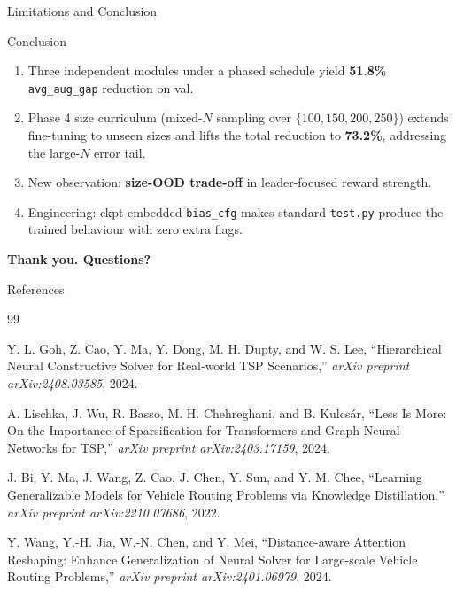 \documentclass[aspectratio=169,11pt]{beamer}
\newcommand{\tightitems}{%
  \setlength{\itemsep}{1.5pt}%
  \setlength{\parsep}{0pt}%
  \setlength{\topsep}{2pt}%
}
\begin{document}
\begin{frame}[t]{Limitations and Conclusion}
  \footnotesize
  \begin{block}{Conclusion}
    \begin{enumerate}\tightitems
      \item Three independent modules under a phased schedule yield \textbf{51.8\%} \texttt{avg\_aug\_gap} reduction on val.
      \item Phase 4 size curriculum (mixed-$N$ sampling over $\{100,150,200,250\}$) extends fine-tuning to unseen sizes and lifts the total reduction to \textbf{73.2\%}, addressing the large-$N$ error tail.
      \item New observation: \textbf{size-OOD trade-off} in leader-focused reward strength.
      \item Engineering: ckpt-embedded \texttt{bias\_cfg} makes standard \texttt{test.py} produce the trained behaviour with zero extra flags.
    \end{enumerate}
  \end{block}

  \centering
  \vspace{0.30cm}
  {\large\color{sdmblue}\textbf{Thank you. Questions?}}
\end{frame}

\begin{frame}[t]{References}
  \scriptsize
  \renewcommand{\newblock}{}

  \begin{thebibliography}{99}

    Y. L. Goh, Z. Cao, Y. Ma, Y. Dong, M. H. Dupty, and W. S. Lee,
    ``Hierarchical Neural Constructive Solver for Real-world TSP Scenarios,''
    \emph{arXiv preprint arXiv:2408.03585}, 2024.

    A. Lischka, J. Wu, R. Basso, M. H. Chehreghani, and B. Kulcsár,
    ``Less Is More: On the Importance of Sparsification for Transformers and Graph Neural Networks for TSP,''
    \emph{arXiv preprint arXiv:2403.17159}, 2024.

    J. Bi, Y. Ma, J. Wang, Z. Cao, J. Chen, Y. Sun, and Y. M. Chee,
    ``Learning Generalizable Models for Vehicle Routing Problems via Knowledge Distillation,''
    \emph{arXiv preprint arXiv:2210.07686}, 2022.

    Y. Wang, Y.-H. Jia, W.-N. Chen, and Y. Mei,
    ``Distance-aware Attention Reshaping: Enhance Generalization of Neural Solver for Large-scale Vehicle Routing Problems,''
    \emph{arXiv preprint arXiv:2401.06979}, 2024.

  \end{thebibliography}
\end{frame}
\end{document}
